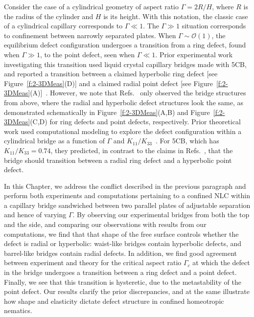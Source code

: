 Consider the case of a cylindrical geometry of aspect ratio $\Gamma = 2 R/H$, where $R$ is the radius of the cylinder and $H$ is its height.
With this notation, the classic case of a cylindrical capillary corresponds to $\Gamma \ll 1$. The $\Gamma \gg 1$ situation corresponds to confinement between narrowly separated plates.
When $\Gamma \sim \mathcal{O}\left( 1 \right)$, the equilibrium defect configuration undergoes a transition from a ring defect, found when $\Gamma \gg 1$, to the point defect, seen when $\Gamma \ll 1$.
Prior experimental work investigating this transition used liquid crystal capillary bridges made with 5CB, and reported a transition between a claimed hyperbolic ring defect [see Figure~\ref{f:2-3DMeas}(D)] and a claimed radial point defect [see Figure~\ref{f:2-3DMeas}(A)]~\cite{RN139,RN147}.
However, we note that Refs.~\cite{RN139,RN147} only observed the bridge structures from above, where the radial and hyperbolic defect structures look the same, as demonstrated schematically in Figure~\ref{f:2-3DMeas}(A,B) and Figure~\ref{f:2-3DMeas}(C,D) for ring defects and point defects, respectively.
Prior theoretical work used computational modeling to explore the defect configuration within a cylindrical bridge as a function of $\Gamma$ and $K_{11}/K_{33}$~\cite{RN138,RN144}.
For 5CB, which has $K_{11}/K_{33} = 0.74$, they predicted, in contrast to the claims in Refs.~\cite{RN139,RN147}, that the bridge should transition between a radial ring defect and a hyperbolic point defect.

In this Chapter, we address the conflict described in the previous paragraph and perform both experiments and computations pertaining to a confined NLC within a capillary bridge sandwiched between two parallel plates of adjustable separation and hence of varying $\Gamma$.
By observing our experimental bridges from both the top and the side, and comparing our observations with results from our computations, we find that that shape of the free surface controls whether the defect is radial or hyperbolic: waist-like bridges contain hyperbolic defects, and barrel-like bridges contain radial defects.
In addition, we find good agreement between experiment and theory for the critical aspect ratio $\Gamma_c$ at which the defect in the bridge undergoes a transition between a ring defect and a point defect.
Finally, we see that this transition is hysteretic, due to the metastability of the point defect.
Our results clarify the prior discrepancies, and at the same illustrate how shape and elasticity dictate defect structure in confined homeotropic nematics.




